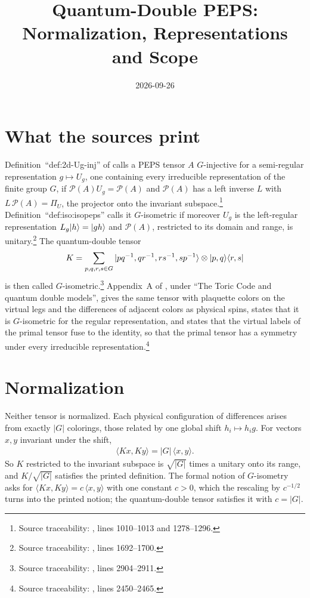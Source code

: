 \documentclass{article}
\title{Quantum-Double PEPS: Normalization, Representations and Scope}
\author{}
\date{2026-09-26}
\begin{document}
\maketitle
{}

\section{What the sources print}
Definition~``def:2d-Ug-inj'' of \cite{Schuch2010PEPS} calls a PEPS tensor
$A$ $G$-injective for a semi-regular representation $g\mapsto U_g$, one
containing every irreducible representation of the finite group $G$, if
$\mathcal P(A)U_g=\mathcal P(A)$ and $\mathcal P(A)$ has a left inverse
$L$ with $L\,\mathcal P(A)=\Pi_U$, the projector onto the invariant
subspace.\footnote{Source traceability:
    , lines 1010--1013 and
    1278--1296.}
Definition~``def:iso:isopeps'' calls it $G$-isometric if moreover $U_g$ is
the left-regular representation $L_g|h\rangle=|gh\rangle$ and $\mathcal P(A)$,
restricted to its domain and range, is unitary.\footnote{Source
    traceability: , lines
    1692--1700.}
The quantum-double tensor
\begin{align}
    K=\sum_{p,q,r,s\in G}|pq^{-1},qr^{-1},rs^{-1},sp^{-1}\rangle\otimes
    |p,q\rangle\langle r,s|
\end{align}
is then called $G$-isometric.\footnote{Source traceability:
    , lines 2904--2911.}
Appendix~A of \cite{Cirac2021Matrix}, under ``The Toric Code and quantum
double models'', gives the same tensor with plaquette colors on the
virtual legs and the differences of adjacent colors as physical spins,
states that it is $G$-isometric for the regular representation, and
states that the virtual labels of the primal tensor fuse to the identity,
so that the primal tensor has a symmetry under every irreducible
representation.\footnote{Source traceability:
    , lines 2450--2465.}

\section{Normalization}
Neither tensor is normalized. Each physical configuration of differences
arises from exactly $|G|$ colorings, those related by one global shift
$h_i\mapsto h_ig$. For vectors $x,y$ invariant under the shift,
\begin{align}
    \langle Kx,Ky\rangle=|G|\,\langle x,y\rangle .
\end{align}
So $K$ restricted to the invariant subspace is $\sqrt{|G|}$ times a
unitary onto its range, and $K/\sqrt{|G|}$ satisfies the printed
definition. The formal notion of $G$-isometry asks for
$\langle Kx,Ky\rangle=c\,\langle x,y\rangle$ with one constant $c>0$,
which the rescaling by $c^{-1/2}$ turns into the printed notion; the
quantum-double tensor satisfies it with $c=|G|$.
\end{document}
